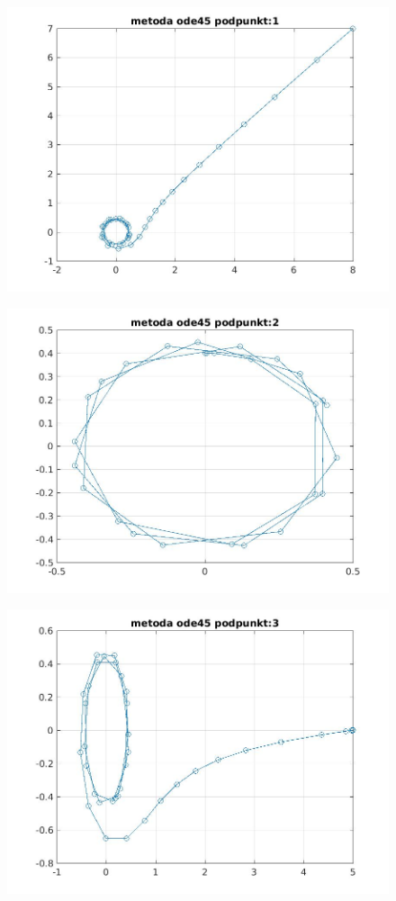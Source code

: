 \documentclass[a4paper, 12pt]{article}
\begin{document}
\begin{figure}[H]
\centering
\includegraphics[width = 15cm]{ode/metoda ode45 podpunkt:1.jpg}
\end{figure}
\begin{figure}[H]
\centering
\includegraphics[width = 15cm]{ode/metoda ode45 podpunkt:2.jpg}
\end{figure}
\begin{figure}[H]
\centering
\includegraphics[width = 15cm]{ode/metoda ode45 podpunkt:3.jpg}
\end{figure}
\end{document}
